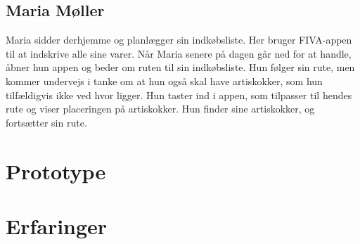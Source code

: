\documentclass[12pt]{article}
\begin{document}
\subsection{Maria Møller}
Maria sidder derhjemme og planlægger sin indkøbsliste. Her bruger FIVA-appen til at indskrive alle sine varer. Når Maria senere på dagen går ned for at handle, åbner hun appen og beder om ruten til sin indkøbsliste. Hun følger sin rute, men kommer undervejs i tanke om at hun også skal have artiskokker, som hun tilfældigvis ikke ved hvor ligger. Hun taster ind i appen, som tilpasser til hendes rute og viser placeringen på artiskokker. Hun finder sine artiskokker, og fortsætter sin rute.

\section{Prototype}

\section{Erfaringer}
\end{document}
